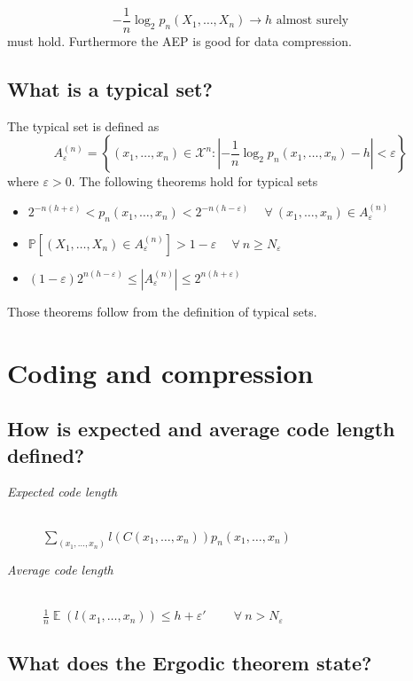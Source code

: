 \documentclass[a4paper]{article}
\newcommand\os[2][P]{\mathbb{#1}\left[#2\right]}
\newcommand\fall{\:\forall\:}
\newcommand\key[1]{\textit{#1}}
\newcommand\card[1]{\left|#1\right|}
\newcommand\converges{\rightarrow}
\DeclareMathOperator{\Ex}{\mathbb{E}}
\theoremstyle{definition}
\begin{document}
\[ -\frac1n \log_2 p_n(X_1, \dotsc, X_n) \converges h \text{ almost surely} \]
must hold. Furthermore the AEP is good for data compression.

\subsection{What is a typical set?}

The typical set is defined as
\[
  A_\varepsilon^{(n)}
    = \left\{
      (x_1, \dotsc, x_n) \in \mathcal{X}^n:
      \left|-\frac1n \log_2 p_n(x_1,\dotsc,x_n) - h\right| < \varepsilon
    \right\}
\]
where $\varepsilon > 0$. The following theorems hold for typical sets
\begin{itemize}
  \item $2^{-n(h+\varepsilon)} < p_n(x_1,\dotsc,x_n) < 2^{-n(h - \varepsilon)} \quad\fall (x_1,\dotsc,x_n) \in A_\varepsilon^{(n)}$
  \item $\os{(X_1,\dotsc,X_n) \in A_\varepsilon^{(n)}} > 1 - \varepsilon \quad \fall n \geq N_\varepsilon$
  \item $(1 - \varepsilon) 2^{n(h-\varepsilon)} \leq \card{A_\varepsilon^{(n)}} \leq 2^{n(h + \varepsilon)}$
\end{itemize}
Those theorems follow from the definition of typical sets.

\section{Coding and compression}

\subsection{How is expected and average code length defined?}

\begin{description}
  \item[\key{Expected code length}] \hfill{} \\
    $\sum_{(x_1,\dotsc,x_n)} l(C(x_1,\dotsc,x_n)) p_n(x_1,\dotsc,x_n)$
  \item[\key{Average code length}] \hfill{} \\
    $\frac1n \Ex\left(l(x_1,\dotsc,x_n)\right) \leq h + \varepsilon' \qquad\fall n > N_\varepsilon$
\end{description}

\subsection{What does the Ergodic theorem state?}
\end{document}
